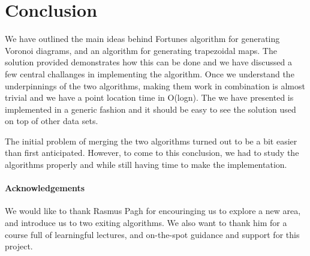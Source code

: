 \section{Conclusion}
We have outlined the main ideas behind Fortunes algorithm for generating Voronoi diagrams, and an algorithm for generating trapezoidal maps. The solution provided demonstrates how this can be done and we have discussed a few central challanges in implementing the algorithm. Once we understand the underpinnings of the two algorithms, making them work in combination is almost trivial and we have a point location time in O(logn). The we have presented is implemented in a generic fashion and it should be easy to see the solution used on top of other data sets.

The initial problem of merging the two algorithms turned out to be a bit easier than first anticipated. However, to come to this conclusion, we had to study the algorithms properly and while still having time to make the implementation.
\paragraph{Acknowledgements}
We would like to thank Rasmus Pagh for encouringing us to explore a new area, and introduce us to two exiting algorithms. We also want to thank him for a course full of learningful lectures, and on-the-spot guidance and support for this project.  